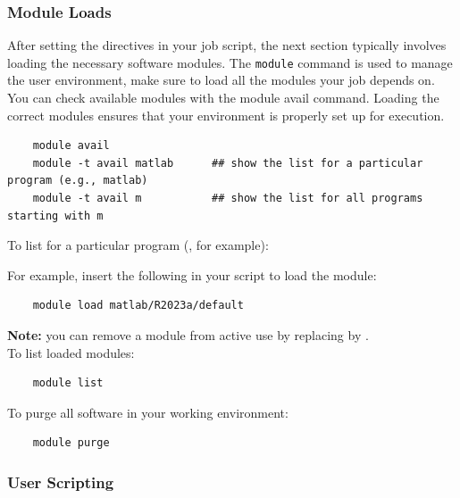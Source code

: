 \documentclass{easychair}
\begin{document}
\subsubsection{Module Loads}
\label{sect:modules}

After setting the directives in your job script, the next section typically involves loading 
the necessary software modules. The \texttt{module} command is used to manage the user environment, 
make sure to load all the modules your job depends on. You can check available modules with the 
module avail command. Loading the correct modules ensures that your environment is properly 
set up for execution.

\begin{verbatim}
    module avail
    module -t avail matlab		## show the list for a particular program (e.g., matlab)
    module -t avail m		    ## show the list for all programs starting with m     
\end{verbatim}

\noindent To list for a particular program (, for example):

\noindent For example, insert the following in your script to load the  module:
\begin{verbatim}
    module load matlab/R2023a/default
\end{verbatim}

\noindent \textbf{Note:} you can remove a module from active use by replacing  by .\\
    
\noindent To list loaded modules:
\begin{verbatim}
    module list
\end{verbatim}
    
\noindent To purge all software in your working environment:
\begin{verbatim}
    module purge
\end{verbatim}

\subsubsection{User Scripting}
\label{sect:scripting}


\end{document}
